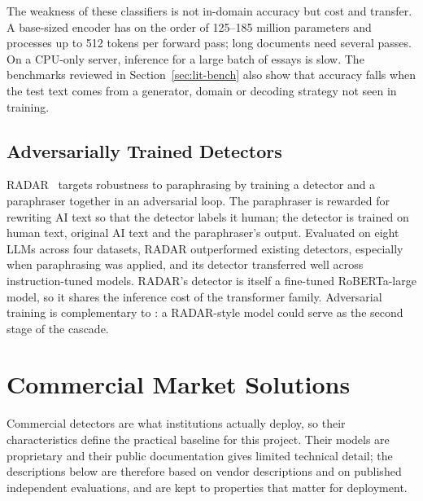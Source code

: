 The weakness of these classifiers is not in-domain accuracy but cost and
transfer. A base-sized encoder has on the order of 125--185 million parameters
and processes up to 512 tokens per forward pass; long documents need several
passes. On a CPU-only server, inference for a large batch of essays is slow.
The benchmarks reviewed in Section~\ref{sec:lit-bench} also show that accuracy
falls when the test text comes from a generator, domain or decoding strategy
not seen in training.

\subsection{Adversarially Trained Detectors}

RADAR~\cite{hu2023radar} targets robustness to paraphrasing by training a
detector and a paraphraser together in an adversarial loop. The paraphraser
is rewarded for rewriting AI text so that the detector labels it human; the
detector is trained on human text, original AI text and the paraphraser's
output. Evaluated on eight LLMs across four datasets, RADAR outperformed
existing detectors, especially when paraphrasing was applied, and its
detector transferred well across instruction-tuned models. RADAR's detector is
itself a fine-tuned RoBERTa-large model, so it shares the inference cost of the
transformer family. Adversarial training is complementary to \veriscript{}:
a RADAR-style model could serve as the second stage of the cascade.

\section{Commercial Market Solutions}

Commercial detectors are what institutions actually deploy, so their
characteristics define the practical baseline for this project. Their models
are proprietary and their public documentation gives limited technical
detail; the descriptions below are therefore based on vendor descriptions and
on published independent evaluations, and are kept to properties that matter
for deployment.


